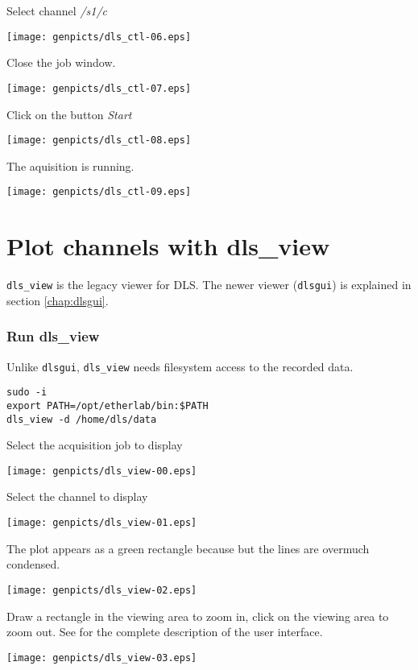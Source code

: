 \noindent Select channel \textit{/s1/c}
\begin{center}
\texttt{[image: genpicts/dls\_ctl-06.eps]}
\end{center}

\noindent Close the job window.
\begin{center}
\texttt{[image: genpicts/dls\_ctl-07.eps]}
\end{center}

\noindent Click on the button \textit{Start}
\begin{center}
\texttt{[image: genpicts/dls\_ctl-08.eps]}
\end{center}

\noindent The aquisition is running.
\begin{center}
\texttt{[image: genpicts/dls\_ctl-09.eps]}
\end{center}




\section{Plot channels with dls\_view }

\texttt{dls\_view} is the legacy viewer for DLS.
The newer viewer (\texttt{dlsgui}) is explained in section \ref{chap:dlsgui}.


\subsubsection{Run dls\_view}

Unlike \texttt{dlsgui}, \texttt{dls\_view} needs filesystem access to the
recorded data.

\begin{verbatim}
sudo -i
export PATH=/opt/etherlab/bin:$PATH
dls_view -d /home/dls/data
\end{verbatim}


\noindent Select the acquisition job to display

\begin{center}
\texttt{[image: genpicts/dls\_view-00.eps]}
\end{center}


\noindent Select the channel to display
\begin{center}
\texttt{[image: genpicts/dls\_view-01.eps]}
\end{center}


\noindent The plot appears as a green rectangle because but the lines
are overmuch condensed.

\begin{center}
\texttt{[image: genpicts/dls\_view-02.eps]}
\end{center}


\noindent Draw a rectangle in the viewing area to zoom in, click on
the viewing area to zoom out. See \cite{dls_user_manual} for the
complete description of the user interface.

\begin{center}
\texttt{[image: genpicts/dls\_view-03.eps]}
\end{center}
